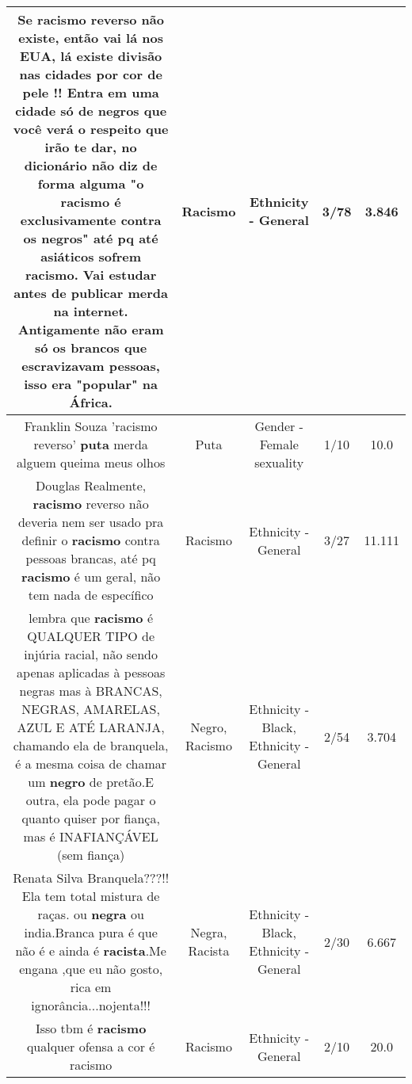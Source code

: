 \documentclass[11pt]{article}
\newlength\mylength
\begin{document}
\begin{center}
\begin{longtable}{|C{.65\mylength}|C{.30\mylength}|C{.12\mylength}|C{.12\mylength}|C{.12\mylength}|}
  \small Se \textbf{racismo} reverso não existe, então vai lá nos EUA, lá existe divisão nas cidades por cor de pele !! Entra em uma cidade só de negros que você verá o respeito que irão te dar, no dicionário não diz de forma alguma "o \textbf{racismo} é exclusivamente contra os negros" até pq até asiáticos sofrem \textbf{racismo}. Vai estudar antes de publicar merda na internet. Antigamente não eram só os brancos que escravizavam pessoas, isso era "popular" na África.\normalsize   & Racismo & Ethnicity - General & 3/78 & 3.846 \\  \hline
  \small Franklin Souza 'racismo reverso' \textbf{puta} merda alguem queima meus olhos\normalsize   & Puta & Gender - Female sexuality & 1/10 & 10.0 \\  \hline
  \small Douglas Realmente, \textbf{racismo} reverso não deveria nem ser usado pra definir o \textbf{racismo} contra pessoas brancas, até pq \textbf{racismo} é um geral, não tem nada de específico\normalsize   & Racismo & Ethnicity - General & 3/27 & 11.111 \\  \hline
  \small lembra que \textbf{racismo} é QUALQUER TIPO de injúria racial, não sendo apenas aplicadas à pessoas negras mas à BRANCAS, NEGRAS, AMARELAS, AZUL E ATÉ LARANJA, chamando ela de branquela, é a mesma coisa de chamar um \textbf{negro} de pretão.E outra, ela pode pagar o quanto quiser por fiança, mas é INAFIANÇÁVEL (sem fiança)\normalsize   & Negro, Racismo & Ethnicity - Black, Ethnicity - General & 2/54 & 3.704 \\  \hline
  \small Renata Silva Branquela???!!  Ela tem total mistura de raças. ou \textbf{negra} ou india.Branca pura é  que não  é e ainda é  \textbf{racista}.Me engana ,que eu não  gosto, rica em ignorância...nojenta!!!\normalsize   & Negra, Racista & Ethnicity - Black, Ethnicity - General & 2/30 & 6.667 \\  \hline
  \small Isso tbm é \textbf{racismo} qualquer ofensa a cor é racismo\normalsize   & Racismo & Ethnicity - General & 2/10 & 20.0 \\  \hline

\end{longtable}
\end{center}
\end{document}
